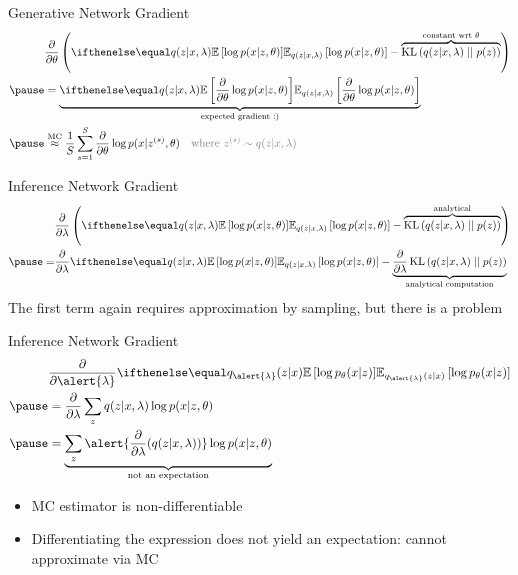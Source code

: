 \begin{frame}{Generative Network Gradient}
\begin{equation*}
\begin{aligned}
&\pdv{\theta} \left( \E[q(z|x,\lambda)]{\log p(x|z,\theta)} - \overbrace{\KL{q(z|x,\lambda)}{p(z)}}^{\text{constant wrt }\theta} \right) \\ \pause 
&=\underbrace{\E[q(z|x,\lambda)]{\pdv{\theta}\log p(x|z,\theta)}}_{\text{expected gradient :)}} \\ \pause
&\overset{\text{MC}}{\approx} \frac{1}{S}\sum_{s=1}^{S}
\pdv{\theta} \log p(x|z^{(s)},\theta) \quad \textcolor{gray}{\text{where } z^{(s)} \sim q(z|x,\lambda)}
\end{aligned}
\end{equation*}

\end{frame}

\begin{frame}{Inference Network Gradient}
\begin{equation*}
\begin{aligned}
&\pdv{\lambda}\left(\E[q(z|x,\lambda)]{\log p(x|z,\theta)} - \overbrace{\KL{q(z|x,\lambda)}{p(z)}}^{\text{analytical}} \right) \\ \pause
=&\pdv{\lambda}\E[q(z|x,\lambda)]{\log p(x|z,\theta)} - \underbrace{\pdv{\lambda}\KL{q(z|x,\lambda)}{p(z)}}_{\text{analytical computation}} \\
\end{aligned}
\end{equation*}
\pause
The first term again requires approximation by sampling,  but there is a problem

\end{frame}

\begin{frame}{Inference Network Gradient}
\begin{equation*}
\begin{aligned}
&\pdv{\alert{\lambda}}\E[q_{\alert{\lambda}}(z|x)]{\log p_\theta(x|z)} \\ \pause
&= \pdv{\lambda} \sum_z q(z|x,\lambda)\log p(x|z, \theta)  \\ \pause
&=  \underbrace{\sum_z \alert{\pdv{\lambda}(q(z|x, \lambda))} \log p(x|z, \theta)}_{\text{not an expectation}} 
\end{aligned}
\end{equation*}

\pause

\begin{itemize}
	\item MC estimator is non-differentiable \\ \pause
	\item Differentiating the expression does not yield an expectation: cannot approximate via MC
\end{itemize}

\end{frame}


